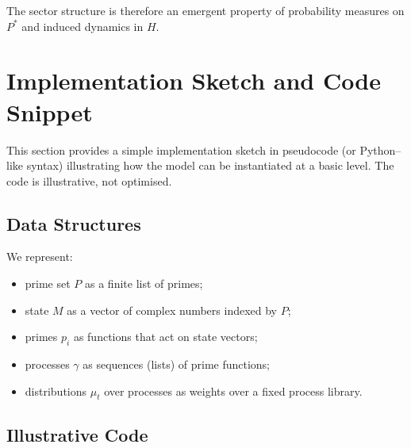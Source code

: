 \documentclass[11pt]{article}
\begin{document}
The sector structure is therefore an emergent property of probability measures on $P^\ast$ and induced dynamics in $H$.

\section{Implementation Sketch and Code Snippet}

This section provides a simple implementation sketch in pseudocode (or Python--like syntax) illustrating how the model can be instantiated at a basic level.
The code is illustrative, not optimised.

\subsection{Data Structures}

We represent:
\begin{itemize}[nosep]
  \item prime set $P$ as a finite list of primes;
  \item state $M$ as a vector of complex numbers indexed by $P$;
  \item primes $p_i$ as functions that act on state vectors;
  \item processes $\gamma$ as sequences (lists) of prime functions;
  \item distributions $\mu_t$ over processes as weights over a fixed process library.
\end{itemize}

\subsection{Illustrative Code}
\end{document}
